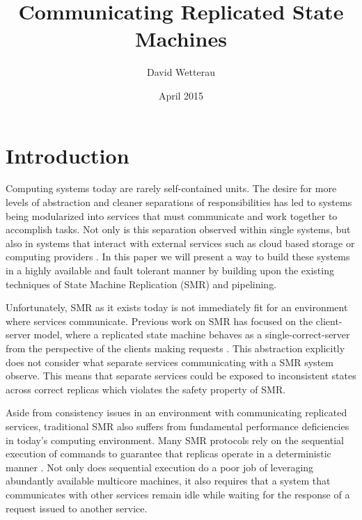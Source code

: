 \documentclass[11pt, oneside]{report}
\title{Communicating Replicated State Machines}
\author{David Wetterau}
\date{April 2015}
\begin{document}
\maketitle

\tableofcontents

\chapter{Introduction}\label{Introduction}
Computing systems today are rarely self-contained units. 
The desire for more levels of abstraction and cleaner separations of responsibilities has led to systems being modularized into services that must communicate and work together to accomplish tasks. 
Not only is this separation observed within single systems, but also in systems that interact with external services such as cloud based storage or computing providers \cite{tao, spanner, dynamo}. 
In this paper we will present a way to build these systems in a highly available and fault tolerant manner by building upon the existing techniques of State Machine Replication (SMR) \cite{practicalBFT, hq, zyz, paxos, paxosMadeSimple, schneider} and pipelining.

Unfortunately, SMR as it exists today is not immediately fit for an environment where services communicate. 
Previous work on SMR has focused on the client-server model, where a replicated state machine behaves as a single-correct-server from the perspective of the clients making requests \cite{schneider}.
This abstraction explicitly does not consider what separate services communicating with a SMR system observe. This means that separate services could be exposed to inconsistent states across correct replicas which violates the safety property of SMR.


Aside from consistency issues in an environment with communicating replicated services, traditional SMR also suffers from fundamental performance deficiencies in today's computing environment. 
Many SMR protocols rely on the sequential execution of commands to guarantee that replicas operate in a deterministic manner \cite{practicalBFT, upRight, hq, paxos}. 
Not only does sequential execution do a poor job of leveraging abundantly available multicore machines, it also requires that a system that communicates with other services remain idle while waiting for the response of a request issued to another service.
\end{document}
